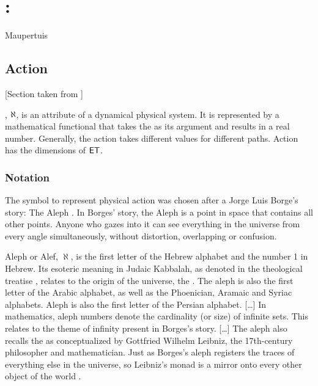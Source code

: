\chapter{\docTitle: \docSubtitle}
%
%
%
{Maupertuis}
{\citep{leastaction:wiki}}


\section{Action}
%
[Section taken from \citep{action:wiki}]

, $\aleph$, is an attribute of a dynamical physical system. It is represented by a mathematical functional that takes the 
%
%
as its argument and results in a real number. Generally, the action takes different values for different paths. Action has the dimensions of $\mathsf{E}\mathsf{T}$.


\subsection{Notation}
%
The symbol to represent physical action was chosen after a Jorge Luis Borge's story: The Aleph \citep{borges:wiki}. In Borges' story, the Aleph is a point in space that contains all other points. Anyone who gazes into it can see everything in the universe from every angle simultaneously, without distortion, overlapping or confusion.

Aleph or Alef, $\aleph$, is the first letter of the Hebrew alphabet and the number 1 in Hebrew. Its esoteric meaning in Judaic Kabbalah, as denoted in the theological treatise , relates to the origin of the universe, the . The aleph is also the first letter of the Arabic alphabet, as well as the Phoenician, Aramaic and Syriac alphabets. Aleph is also the first letter of the Persian alphabet. [\dots] In mathematics, aleph numbers denote the cardinality (or size) of infinite sets. This relates to the theme of infinity present in Borges's story. [\dots] The aleph also recalls the  as conceptualized by Gottfried Wilhelm Leibniz, the 17th-century philosopher and mathematician. Just as Borges's aleph registers the traces of everything else in the universe, so Leibniz's monad is a mirror onto every other object of the world \citep{borges:wiki}.


